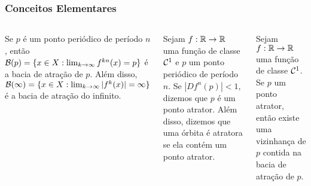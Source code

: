 
\begin{frame} 
\vspace{5pt}
\frametitle{Conceitos Elementares}
\begin{columns}
\column{\dimexpr\paperwidth-15pt}

\begin{definition} 
Se $p$ é um ponto periódico de período $n$, então
$\mathcal{B}(p) = \lbrace x \in  X: \lim_{k \to \infty} f^{kn}(x) = p \rbrace$
é a bacia de atração de $p$. Além disso,
$\mathcal{B}(\infty) = \lbrace x \in  X: \lim_{k \to \infty} |f^k(x)| = \infty \rbrace$
é a bacia de atração do infinito.
\end{definition}

\vspace{10pt}

\begin{definition}
Sejam $f: \mathbb{R} \to \mathbb{R}$ uma função de classe $\mathcal{C}^1$ e $p$ um ponto periódico de período $n$. Se $|D f^n(p)| < 1$, dizemos que $p$ é um ponto atrator. Além disso, dizemos que uma órbita é atratora se ela contém um ponto atrator.
\end{definition}

\vspace{10pt}

\begin{theorem}
Sejam $f: \mathbb{R} \to \mathbb{R}$ uma função de classe $\mathcal{C}^1$. Se $p$ um ponto atrator, então existe uma vizinhança de $p$ contida na bacia de atração de $p$.
\end{theorem}
\end{columns}
\end{frame}
